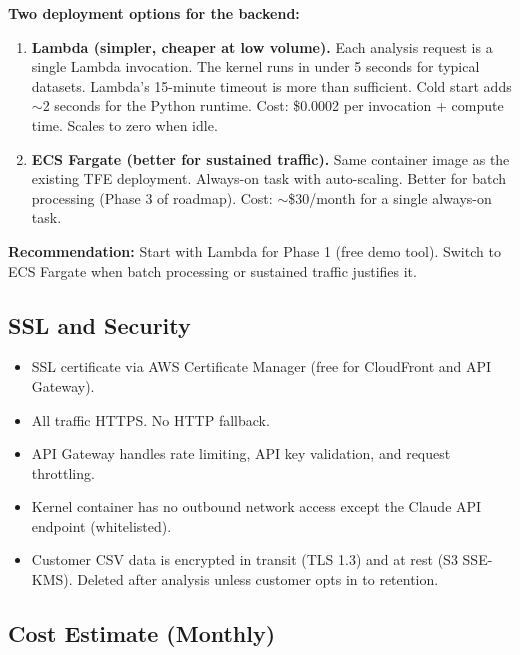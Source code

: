 \documentclass[11pt,letterpaper]{article}
\begin{document}
\textbf{Two deployment options for the backend:}

\begin{enumerate}
  \item \textbf{Lambda (simpler, cheaper at low volume).} Each
    analysis request is a single Lambda invocation. The kernel runs
    in under 5 seconds for typical datasets. Lambda's 15-minute
    timeout is more than sufficient. Cold start adds $\sim$2 seconds
    for the Python runtime. Cost: \$0.0002 per invocation + compute
    time. Scales to zero when idle.

  \item \textbf{ECS Fargate (better for sustained traffic).} Same
    container image as the existing TFE deployment. Always-on task
    with auto-scaling. Better for batch processing (Phase 3 of
    roadmap). Cost: $\sim$\$30/month for a single always-on task.
\end{enumerate}

\textbf{Recommendation:} Start with Lambda for Phase 1 (free demo
tool). Switch to ECS Fargate when batch processing or sustained
traffic justifies it.

\subsection{SSL and Security}

\begin{itemize}
  \item SSL certificate via AWS Certificate Manager (free for
    CloudFront and API Gateway).
  \item All traffic HTTPS. No HTTP fallback.
  \item API Gateway handles rate limiting, API key validation,
    and request throttling.
  \item Kernel container has no outbound network access except
    the Claude API endpoint (whitelisted).
  \item Customer CSV data is encrypted in transit (TLS 1.3) and
    at rest (S3 SSE-KMS). Deleted after analysis unless customer
    opts in to retention.
\end{itemize}

\subsection{Cost Estimate (Monthly)}
\end{document}
